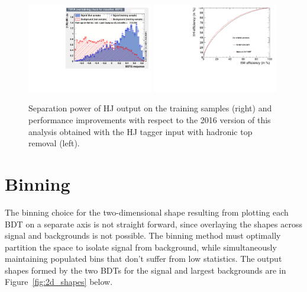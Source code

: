 \begin{figure}[htp]
\centering
\includegraphics[width=0.49\textwidth]{ch9_figs/Jtagger_Ks.pdf}
\includegraphics[width=0.49\textwidth]{ch9_figs/Roc_Comparison_18Feb.pdf}
\caption[Performance improvement from the HJ tagger and hadronic top removal]{Separation power of HJ output on the training samples (right) and performance improvements with respect to the 2016 version of this analysis obtained with the HJ
tagger input with hadronic top removal (left).}
\label{fig:hj_tagger}
\end{figure}

\section{Binning}
The binning choice for the two-dimensional shape resulting from plotting each BDT on a separate axis is not straight forward, since overlaying the shapes across signal and backgrounds is not possible.
The binning method must optimally partition the space to isolate
signal from background, while simultaneously maintaining populated bins that don't suffer from low statistics. The output shapes formed by the two BDTs for the signal and largest backgrounds
are in Figure~\ref{fig:2d_shapes} below. 

